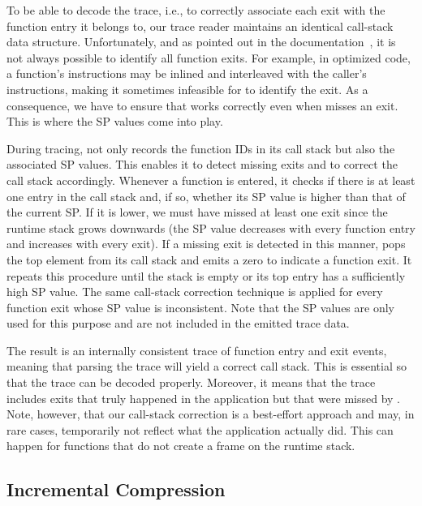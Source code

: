 To be able to decode the trace, i.e., to correctly associate each exit with the function entry it belongs to, our trace reader maintains an identical call-stack data structure. Unfortunately, and as pointed out in the \pin documentation~\cite{pinurl}, it is not always possible to identify all function exits. For example, in optimized code, a function's instructions may be inlined and interleaved with the caller's instructions, making it sometimes infeasible for \pin to identify the exit. As a consequence, we have to ensure that \parlot works correctly even when \pin misses an exit. This is where the SP values come into play.

During tracing, \parlot not only records the function IDs in its call stack but also the associated SP values. This enables it to detect missing exits and to correct the call stack accordingly. Whenever a function is entered, it checks if there is at least one entry in the call stack and, if so, whether its SP value is higher than that of the current SP. If it is lower, we must have missed at least one exit since the runtime stack grows downwards (the SP value decreases with every function entry and increases with every exit). If a missing exit is detected in this manner, \parlot pops the top element from its call stack and emits a zero to indicate a function exit. It repeats this procedure until the stack is empty or its top entry has a sufficiently high SP value. The same call-stack correction technique is applied for every function exit whose SP value is inconsistent. Note that the SP values are only used for this purpose and are not included in the emitted trace data.

The result is an internally consistent trace of function entry and exit events, meaning that parsing the trace will yield a correct call stack. This is essential so that the trace can be decoded properly. Moreover, it means that the trace includes exits that truly happened in the application but that were missed by \pin. Note, however, that our call-stack correction is a best-effort approach and may, in rare cases, temporarily not reflect what the application actually did. This can happen for functions that do not create a frame on the runtime stack.


\subsection{Incremental Compression}
\label{sec:incr-compr}

